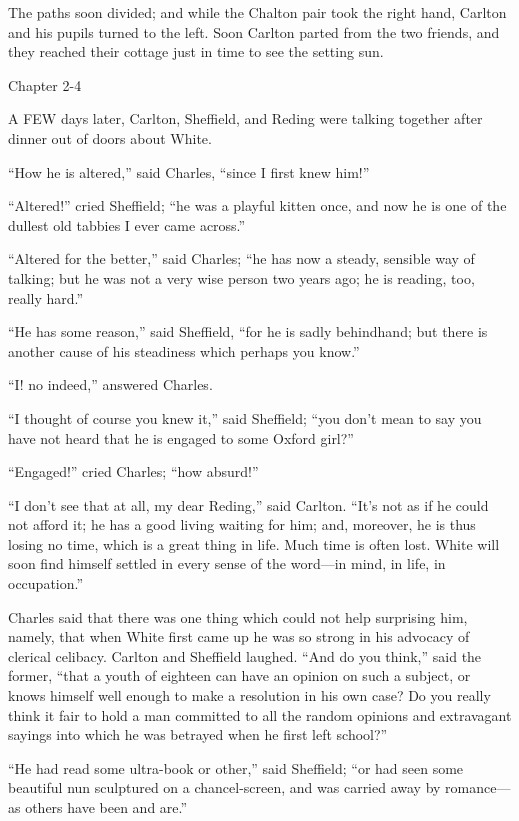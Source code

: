 The paths soon divided; and while the Chalton pair took the right
hand, Carlton and his pupils turned to the left. Soon Carlton parted
from the two friends, and they reached their cottage just in time to
see the setting sun.

Chapter 2-4


A FEW days later, Carlton, Sheffield,
and Reding were talking together after dinner out of doors about
White.

``How he is altered,'' said Charles, ``since I first
knew him!''

``Altered!'' cried Sheffield; ``he was a playful kitten once,
and now he is one of the dullest old tabbies I ever came across.''

``Altered for the better,'' said Charles; ``he has now
a steady, sensible way of talking; but he was not a very wise person
two years ago; he is reading, too, really hard.''

``He has some reason,'' said Sheffield, ``for he is
sadly behindhand; but there is another cause of his steadiness which
perhaps you know.''

``I! no indeed,'' answered Charles.

``I thought of course you knew it,'' said Sheffield;
``you don't mean to say you have not heard that he is engaged to
some Oxford girl?''

``Engaged!'' cried Charles; ``how absurd!''

``I don't see that at all, my dear Reding,'' said Carlton.
``It's not as if he could not afford it; he has a good living
waiting for him; and, moreover, he is thus losing no time, which
is a great thing in life. Much time is often lost. White will soon
find himself settled in every sense of the word—in mind, in life, in
occupation.''

Charles said that there was one thing which could not help
surprising him, namely, that when White first came up he was so strong
in his advocacy of clerical celibacy. Carlton and Sheffield laughed.
``And do you think,'' said the former, ``that a youth of
eighteen can have an opinion on such a subject, or knows himself well
enough to make a resolution in his own case? Do you really think it
fair to hold a man committed to all the random opinions and
extravagant sayings into which he was betrayed when he first left
school?''

``He had read some ultra-book or other,'' said Sheffield;
``or had seen some beautiful nun sculptured on a chancel-screen,
and was carried away by romance—as others have been and are.''

